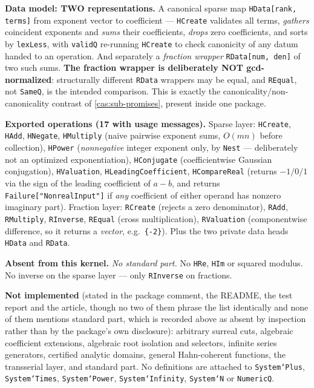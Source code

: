 \documentclass[11pt,letterpaper]{article}
\numberwithin{equation}{section}
\theoremstyle{definition}
\theoremstyle{remark}
\begin{document}
\textbf{Data model: TWO representations.} A canonical sparse map
\texttt{HData[rank, terms]} from exponent vector to coefficient ---
\texttt{HCreate} validates all terms, \emph{gathers} coincident exponents and
\emph{sums} their coefficients, \emph{drops} zero coefficients, and sorts by
\texttt{lexLess}, with \texttt{validQ} re-running \texttt{HCreate} to check
canonicity of any datum handed to an operation. And separately a \emph{fraction
wrapper} \texttt{RData[num, den]} of two such sums. \textbf{The fraction wrapper
is deliberately NOT gcd-normalized}: structurally different \texttt{RData}
wrappers may be equal, and \texttt{REqual}, not \texttt{SameQ}, is the intended
comparison. This is exactly the canonicality/non-canonicality contrast of
\cref{cas:sub-promises}, present inside one package.

\textbf{Exported operations (17 with usage messages).} Sparse layer:
\texttt{HCreate}, \texttt{HAdd}, \texttt{HNegate}, \texttt{HMultiply} (naive
pairwise exponent sums, $O(mn)$ before collection), \texttt{HPower}
(\emph{nonnegative} integer exponent only, by \texttt{Nest} --- deliberately not
an optimized exponentiation), \texttt{HConjugate} (coefficientwise Gaussian
conjugation), \texttt{HValuation}, \texttt{HLeadingCoefficient},
\texttt{HCompareReal} (returns $-1/0/1$ via the sign of the leading coefficient
of $a-b$, and returns \texttt{Failure["NonrealInput"]} if \emph{any} coefficient
of either operand has nonzero imaginary part). Fraction layer:
\texttt{RCreate} (rejects a zero denominator), \texttt{RAdd},
\texttt{RMultiply}, \texttt{RInverse}, \texttt{REqual} (cross multiplication),
\texttt{RValuation} (componentwise difference, so it returns a \emph{vector},
e.g.\ \texttt{\{-2\}}). Plus the two private data heads \texttt{HData} and
\texttt{RData}.

\textbf{Absent from this kernel.} \emph{No standard part.} No \texttt{HRe},
\texttt{HIm} or squared modulus. No inverse on the sparse layer --- only
\texttt{RInverse} on fractions.

\textbf{Not implemented} (stated in the package comment, the README, the test
report and the article, though no two of them phrase the list identically and
none of them mentions standard part, which is recorded above as absent by
inspection rather than by the package's own disclosure): arbitrary surreal cuts,
algebraic coefficient extensions, algebraic root isolation and selectors,
infinite series generators, certified analytic domains, general Hahn-coherent
functions, the transserial
layer, and standard part. No definitions are attached to \texttt{System`Plus},
\texttt{System`Times}, \texttt{System`Power}, \texttt{System`Infinity},
\texttt{System`N} or \texttt{NumericQ}.
\end{document}
